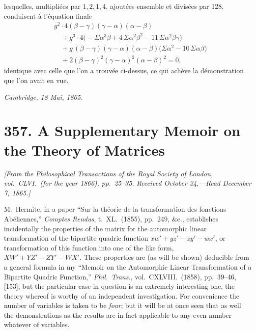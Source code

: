 \documentclass[11pt]{article}
\begin{document}
lesquelles, multipli\'ees par $1, 2, 1, 4$, ajout\'ees ensemble et divis\'ees par 128, conduisent \`a l'\'equation finale
\begin{align*}
& g^{2} \cdot 4(\beta - \gamma)(\gamma - \alpha)(\alpha - \beta) \\
& \quad + g^{3} \cdot 4\bigl(-\Sigma \alpha^{3}\beta + 4\,\Sigma \alpha^{2}\beta^{2} - 11\,\Sigma \alpha^{2}\beta\gamma\bigr) \\
& \quad + g\,(\beta - \gamma)(\gamma - \alpha)(\alpha - \beta)\bigl(\Sigma \alpha^{2} - 10\,\Sigma \alpha\beta\bigr) \\
& \quad + 2(\beta - \gamma)^{2}(\gamma - \alpha)^{2}(\alpha - \beta)^{2} = 0,
\end{align*}
identique avec celle que l'on a trouv\'ee ci-dessus, ce qui ach\`eve la d\'emonstration que l'on avait en vue.

\medskip
\hfill\textit{Cambridge, 18 Mai, 1865.}


\bigskip
\section*{357. A Supplementary Memoir on the Theory of Matrices}

\noindent\textit{[From the \textit{Philosophical Transactions of the Royal Society of London}, vol.~CLVI.\ (for the year 1866), pp.~25--35. Received October 24,---Read December 7, 1865.]}

\medskip

M.~Hermite, in a paper ``Sur la th\'eorie de la transformation des fonctions Ab\'eliennes,'' \textit{Comptes Rendus}, t.~XL.~(1855), pp.~249, \&c., establishes incidentally the properties of the matrix for the automorphic linear transformation of the bipartite quadric function $x w' + y z' - z y' - w x'$, or transformation of this function into one of the like form, $X W' + Y Z' - Z Y' - W X'$. These properties are (as will be shown) deducible from a general formula in my ``Memoir on the Automorphic Linear Transformation of a Bipartite Quadric Function,'' \textit{Phil.\ Trans.}, vol.~CXLVIII.~(1858), pp.~39--46, [153]; but the particular case in question is an extremely interesting one, the theory whereof is worthy of an independent investigation. For convenience the number of variables is taken to be \textit{four}; but it will be at once seen that as well the demonstrations as the results are in fact applicable to any even number whatever of variables.
\end{document}
